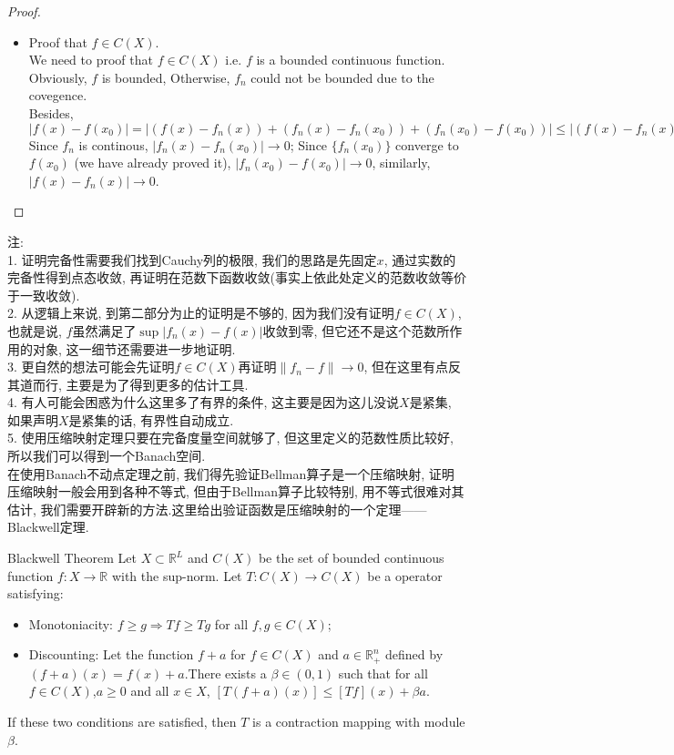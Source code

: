 \begin{proof}
\begin{itemize}
        \item Proof that $f\in C(X)$.\\
        We need to proof that $f\in C(X)$ i.e. $f$ is a bounded continuous function.\\
        Obviously, $f$ is bounded, Otherwise, $f_n$ could not be bounded due to  the covegence.\\
        Besides, $|f(x)-f(x_0)|=|(f(x)-f_n(x))+(f_n(x)-f_n(x_0))+(f_n(x_0)-f(x_0))|\leq |(f(x)-f_n(x))|+|(f_n(x)-f_n(x_0))|+|(f_n(x_0)-f(x_0))|$\\
        Since $f_n$ is continous, $|f_n(x)-f_n(x_0)|\to 0$; Since $\{f_n(x_0)\}$ converge to $f(x_0)$ (we have already proved it), $|f_n(x_0)-f(x_0)|\to 0$, similarly, $|f(x)-f_n(x)|\to 0$.

    \end{itemize}
\end{proof}
\noindent 注:\\
1. 证明完备性需要我们找到Cauchy列的极限, 我们的思路是先固定$x$, 通过实数的完备性得到点态收敛, 再证明在范数下函数收敛(事实上依此处定义的范数收敛等价于一致收敛).\\
2. 从逻辑上来说, 到第二部分为止的证明是不够的, 因为我们没有证明$f\in C(X)$, 也就是说, $f$虽然满足了$\sup |f_n(x)-f(x)|$收敛到零, 但它还不是这个范数所作用的对象, 这一细节还需要进一步地证明.\\
3. 更自然的想法可能会先证明$f\in C(X)$再证明$\|f_n-f\|\to 0 $, 但在这里有点反其道而行, 主要是为了得到更多的估计工具.\\
4. 有人可能会困惑为什么这里多了有界的条件, 这主要是因为这儿没说$X$是紧集, 如果声明$X$是紧集的话, 有界性自动成立.\\
5. 使用压缩映射定理只要在完备度量空间就够了, 但这里定义的范数性质比较好, 所以我们可以得到一个Banach空间.\\

在使用Banach不动点定理之前, 我们得先验证Bellman算子是一个压缩映射, 证明压缩映射一般会用到各种不等式, 但由于Bellman算子比较特别, 用不等式很难对其估计, 我们需要开辟新的方法.这里给出验证函数是压缩映射的一个定理——Blackwell定理.
\begin{theorem}{Blackwell Theorem}
    Let $X\subset\mathbb{R}^L$ and $C(X)$ be the set of bounded continuous function $f:X\to\mathbb{R}$ with the sup-norm.
    Let $T:C(X)\to C(X)$ be a operator satisfying:
    \begin{itemize}
        \item Monotoniacity: $f\geq g\Rightarrow Tf\geq Tg$ for all $f,g\in C(X)$;
        \item Discounting: Let the function $f+a$ for $f\in C(X)$ and $a\in\mathbb{R}^n_+$ defined by $(f+a)(x)=f(x)+a$.There exists a $\beta\in(0,1)$ such that for all $f\in C(X)$,$a\geq 0$ and all $x\in X$, $[T(f+a)(x)]\leq [Tf](x)+\beta a$.
    \end{itemize}
   If these two conditions are satisfied, then $T$ is a contraction mapping with module $\beta$.
\end{theorem}

